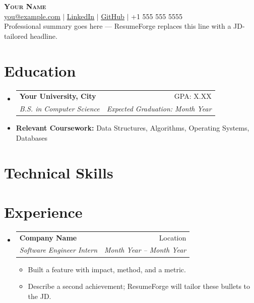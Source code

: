 \documentclass[letterpaper,10pt]{article}
\makeatletter
\newcommand{\resumeItem}[1]{
  \item{\small\setlength{\baselineskip}{10pt} #1 \vspace{-2pt}}
}
\newcommand{\resumeSubheading}[4]{
  \vspace{-2pt}\item
    \begin{tabular*}{\textwidth}[t]{@{}p{0.75\textwidth}@{\extracolsep{\fill}}r@{}}
      \textbf{#1} & \small #2 \\
      \textit{\small#3} & \textit{\small #4} \\
    \end{tabular*}\vspace{-4pt}
}
\newcommand{\resumeSubHeadingListStart}{\begin{itemize}[leftmargin=0in, label={}, topsep=0pt, partopsep=0pt]}
\newcommand{\resumeSubHeadingListEnd}{\end{itemize}}
\newcommand{\resumeItemListStart}{\begin{itemize}[leftmargin=0.15in, label={$\bullet$}, topsep=0pt, partopsep=0pt, itemsep=3pt, parsep=0pt]}
\newcommand{\resumeItemListEnd}{\end{itemize}}
\makeatother
\begin{document}
\fontsize{10.5}{11}\selectfont
\begin{center}
    {\Huge \scshape \textbf{Your Name}} \\ \vspace{4pt}
    \href{mailto:you@example.com}{\ul{you@example.com}} $|$
    \href{https://www.linkedin.com/in/your-handle/}{\ul{LinkedIn}} $|$
    \href{https://github.com/your-handle}{\ul{GitHub}} $|$
    +1 555 555 5555
    \\ \vspace{6pt}
    {Professional summary goes here — ResumeForge replaces this line with a JD-tailored headline.}
\end{center}
\section{Education}
\resumeSubHeadingListStart
  \resumeSubheading
    {Your University, City}{GPA: X.XX}
    {B.S. in Computer Science}{\textit{Expected Graduation: Month Year}}  \vspace{-9pt}
  \item \small{\textbf{Relevant Coursework:} Data Structures, Algorithms, Operating Systems, Databases}
\resumeSubHeadingListEnd
\section{Technical Skills}
\begin{itemize}[leftmargin=0in, label={}, topsep=0pt, partopsep=0pt]
  \small{\item{
  }}
\end{itemize}
\section{Experience}
\resumeSubHeadingListStart
  \resumeSubheading
    {Company Name}{Location}
    {Software Engineer Intern}{Month Year -- Month Year}
    \resumeItemListStart
      \resumeItem{Built a feature with impact, method, and a metric.}
      \resumeItem{Describe a second achievement; ResumeForge will tailor these bullets to the JD.}
    \resumeItemListEnd
\resumeSubHeadingListEnd
\end{document}
